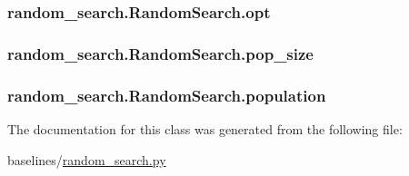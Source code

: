 \subsubsection[{\texorpdfstring{opt}{opt}}]{\setlength{\rightskip}{0pt plus 5cm}random\+\_\+search.\+Random\+Search.\+opt}\hypertarget{classrandom__search_1_1_random_search_a1c853c735f1ffdfed2377b535c86dfb8}{}\label{classrandom__search_1_1_random_search_a1c853c735f1ffdfed2377b535c86dfb8}
\subsubsection[{\texorpdfstring{pop\+\_\+size}{pop_size}}]{\setlength{\rightskip}{0pt plus 5cm}random\+\_\+search.\+Random\+Search.\+pop\+\_\+size}\hypertarget{classrandom__search_1_1_random_search_aec15904852f536501f145ef3ae617ef6}{}\label{classrandom__search_1_1_random_search_aec15904852f536501f145ef3ae617ef6}
\subsubsection[{\texorpdfstring{population}{population}}]{\setlength{\rightskip}{0pt plus 5cm}random\+\_\+search.\+Random\+Search.\+population}\hypertarget{classrandom__search_1_1_random_search_a6b6f7c82b0264087fc807cc77566fdcb}{}\label{classrandom__search_1_1_random_search_a6b6f7c82b0264087fc807cc77566fdcb}


The documentation for this class was generated from the following file\+:\begin{DoxyCompactItemize}
\item 
baselines/\hyperlink{random__search_8py}{random\+\_\+search.\+py}\end{DoxyCompactItemize}
